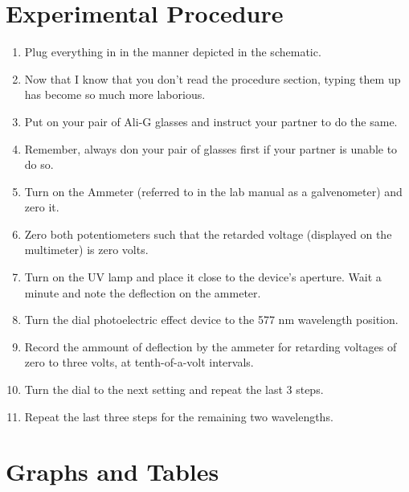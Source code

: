 \documentclass{amsart}
\begin{document}
\section{Experimental Procedure}
\begin{enumerate}
    \item Plug everything in in the manner depicted in the schematic.
    \item Now that I know that you don't read the procedure section, typing them up has become so much more laborious.
    \item Put on your pair of Ali-G glasses and instruct your partner to do the same.
    \item Remember, always don your pair of glasses first if your partner is unable to do so.
    \item Turn on the Ammeter (referred to in the lab manual as a galvenometer) and zero it.
    \item Zero both potentiometers such that the retarded voltage (displayed on the multimeter) is zero volts.
    \item Turn on the UV lamp and place it close to the device's aperture. Wait a minute and note the deflection on the ammeter.
    \item Turn the dial photoelectric effect device to the 577 nm wavelength position.
    \item Record the ammount of deflection by the ammeter for retarding voltages of zero to three volts, at tenth-of-a-volt intervals.
    \item Turn the dial to the next setting and repeat the last 3 steps.
    \item Repeat the last three steps for the remaining two wavelengths.
\end{enumerate}

\section{Graphs and Tables}
\end{document}

